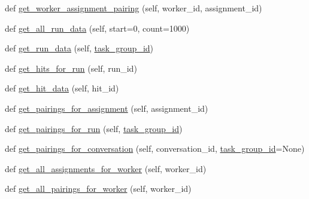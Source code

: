 \begin{DoxyCompactItemize}
def \hyperlink{classparlai_1_1mturk_1_1core_1_1dev_1_1mturk__data__handler_1_1MTurkDataHandler_a9aa7011c4fdd163ed18b99bbd697da78}{get\+\_\+worker\+\_\+assignment\+\_\+pairing} (self, worker\+\_\+id, assignment\+\_\+id)
\item 
def \hyperlink{classparlai_1_1mturk_1_1core_1_1dev_1_1mturk__data__handler_1_1MTurkDataHandler_a23837cfc187beca71c486a2b3000459e}{get\+\_\+all\+\_\+run\+\_\+data} (self, start=0, count=1000)
\item 
def \hyperlink{classparlai_1_1mturk_1_1core_1_1dev_1_1mturk__data__handler_1_1MTurkDataHandler_a915eb49ef703f1606b8039a76b6a9385}{get\+\_\+run\+\_\+data} (self, \hyperlink{classparlai_1_1mturk_1_1core_1_1dev_1_1mturk__data__handler_1_1MTurkDataHandler_af4bebaca067ce2d388fe76ee8859e1bd}{task\+\_\+group\+\_\+id})
\item 
def \hyperlink{classparlai_1_1mturk_1_1core_1_1dev_1_1mturk__data__handler_1_1MTurkDataHandler_a9effb9b4fadb19804787129f064f23a2}{get\+\_\+hits\+\_\+for\+\_\+run} (self, run\+\_\+id)
\item 
def \hyperlink{classparlai_1_1mturk_1_1core_1_1dev_1_1mturk__data__handler_1_1MTurkDataHandler_aac6a98f191bfacfb9092f2d0138fb429}{get\+\_\+hit\+\_\+data} (self, hit\+\_\+id)
\item 
def \hyperlink{classparlai_1_1mturk_1_1core_1_1dev_1_1mturk__data__handler_1_1MTurkDataHandler_a112a75abc2ccd02aa53119c88d1c6bb2}{get\+\_\+pairings\+\_\+for\+\_\+assignment} (self, assignment\+\_\+id)
\item 
def \hyperlink{classparlai_1_1mturk_1_1core_1_1dev_1_1mturk__data__handler_1_1MTurkDataHandler_aac09cee0791b834add5a50e430b6030e}{get\+\_\+pairings\+\_\+for\+\_\+run} (self, \hyperlink{classparlai_1_1mturk_1_1core_1_1dev_1_1mturk__data__handler_1_1MTurkDataHandler_af4bebaca067ce2d388fe76ee8859e1bd}{task\+\_\+group\+\_\+id})
\item 
def \hyperlink{classparlai_1_1mturk_1_1core_1_1dev_1_1mturk__data__handler_1_1MTurkDataHandler_a507259114132bb247683c7f9b127c12c}{get\+\_\+pairings\+\_\+for\+\_\+conversation} (self, conversation\+\_\+id, \hyperlink{classparlai_1_1mturk_1_1core_1_1dev_1_1mturk__data__handler_1_1MTurkDataHandler_af4bebaca067ce2d388fe76ee8859e1bd}{task\+\_\+group\+\_\+id}=None)
\item 
def \hyperlink{classparlai_1_1mturk_1_1core_1_1dev_1_1mturk__data__handler_1_1MTurkDataHandler_a46feee52b8950688e8d916dcd263d2c1}{get\+\_\+all\+\_\+assignments\+\_\+for\+\_\+worker} (self, worker\+\_\+id)
\item 
def \hyperlink{classparlai_1_1mturk_1_1core_1_1dev_1_1mturk__data__handler_1_1MTurkDataHandler_ab4f6bcf277206b3ac02971f208c2ec32}{get\+\_\+all\+\_\+pairings\+\_\+for\+\_\+worker} (self, worker\+\_\+id)

\end{DoxyCompactItemize}
